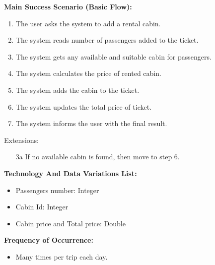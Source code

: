 \textbf{Main Success Scenario (Basic Flow):}
\begin{enumerate}
\item The user asks the system to add a rental cabin.
\item The system reads number of passengers added to the ticket.
\item The system gets any available and suitable cabin for passengers.
\item The system calculates the price of rented cabin.
\item The system adds the cabin to the ticket.
\item The system updates the total price of ticket.
\item The system informs the user with the final result.
\end{enumerate}
Extensions:
\begin{enumerate}
\item[3a] If no available cabin is found, then move to step 6.
\end{enumerate}
\textbf{Technology And Data Variations List:} 
\begin{itemize}
    \item Passengers number: Integer
    \item Cabin Id: Integer
    \item Cabin price and Total price: Double
\end{itemize}
\textbf{Frequency of Occurrence:}
\begin{itemize}
    \item Many times per trip each day.
\end{itemize}
